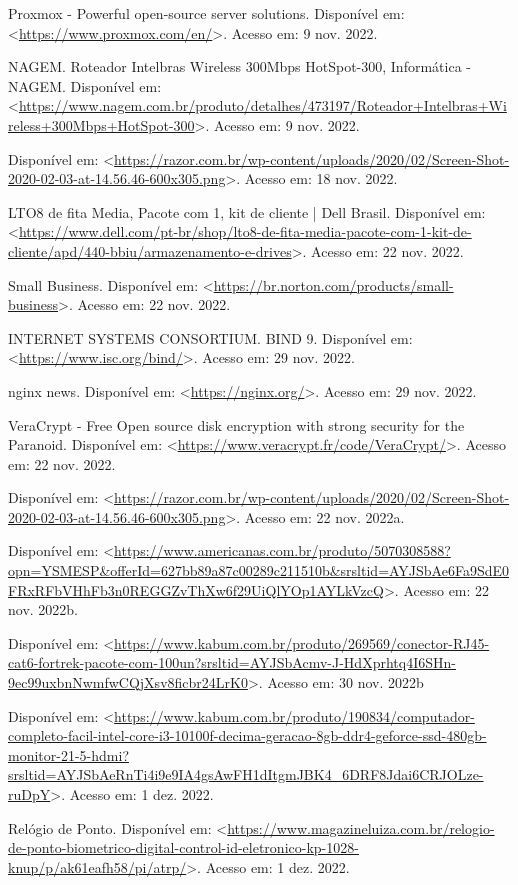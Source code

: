 \documentclass[12pt]{article}
\begin{document}
Proxmox - Powerful open-source server solutions. Disponível em: <\url{https://www.proxmox.com/en/}>. Acesso em: 9 nov. 2022.

NAGEM. Roteador Intelbras Wireless 300Mbps HotSpot-300, Informática - NAGEM. Disponível em:
<\url{https://www.nagem.com.br/produto/detalhes/473197/Roteador+Intelbras+Wireless+300Mbps+HotSpot-300}>. Acesso em: 9 nov. 2022.

Disponível em: <\url{https://razor.com.br/wp-content/uploads/2020/02/Screen-Shot-2020-02-03-at-14.56.46-600x305.png}>. Acesso em: 18 nov. 2022.

LTO8 de fita Media, Pacote com 1, kit de cliente | Dell Brasil. Disponível em: <\url{https://www.dell.com/pt-br/shop/lto8-de-fita-media-pacote-com-1-kit-de-cliente/apd/440-bbiu/armazenamento-e-drives}>. Acesso em: 22 nov. 2022.

Small Business. Disponível em: <\url{https://br.norton.com/products/small-business}>. Acesso em: 22 nov. 2022.

INTERNET SYSTEMS CONSORTIUM. BIND 9. Disponível em: <\url{https://www.isc.org/bind/}>. Acesso em: 29 nov. 2022.

nginx news. Disponível em: <\url{https://nginx.org/}>. Acesso em: 29 nov. 2022.

VeraCrypt - Free Open source disk encryption with strong security for the Paranoid. Disponível em: <\url{https://www.veracrypt.fr/code/VeraCrypt/}>. Acesso em: 22 nov. 2022.

Disponível em: <\url{https://razor.com.br/wp-content/uploads/2020/02/Screen-Shot-2020-02-03-at-14.56.46-600x305.png}>. Acesso em: 22 nov. 2022a.

Disponível em: <\url{https://www.americanas.com.br/produto/5070308588?opn=YSMESP&offerId=627bb89a87c00289c211510b&srsltid=AYJSbAe6Fa9SdE0FRxRFbVHhFb3n0REGGZvThXw6f29UiQlYOp1AYLkVzcQ}>. Acesso em: 22 nov. 2022b.

Disponível em: <\url{https://www.kabum.com.br/produto/269569/conector-RJ45-cat6-fortrek-pacote-com-100un?srsltid=AYJSbAcmv-J-HdXprhtq4I6SHn-9ec99uxbnNwmfwCQjXsv8ficbr24LrK0}>. Acesso em: 30 nov. 2022b

Disponível em: <\url{https://www.kabum.com.br/produto/190834/computador-completo-facil-intel-core-i3-10100f-decima-geracao-8gb-ddr4-geforce-ssd-480gb-monitor-21-5-hdmi?srsltid=AYJSbAeRnTi4i9e9IA4gsAwFH1dItgmJBK4_6DRF8Jdai6CRJOLze-ruDpY}>. Acesso em: 1 dez. 2022.

Relógio de Ponto. Disponível em: <\url{https://www.magazineluiza.com.br/relogio-de-ponto-biometrico-digital-control-id-eletronico-kp-1028-knup/p/ak61eafh58/pi/atrp/}>. Acesso em: 1 dez. 2022.
\end{document}
